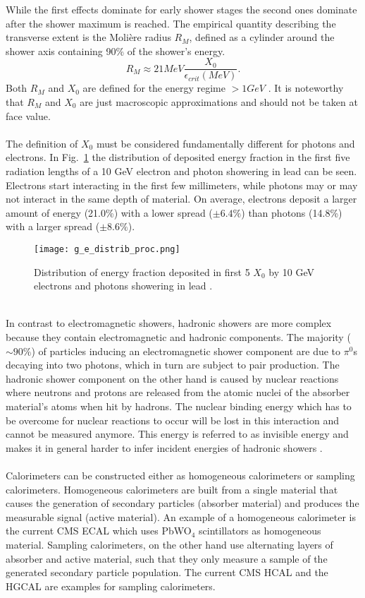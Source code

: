 \documentclass[../../main.tex]{subfiles}
\begin{document}
While the first effects dominate for early shower stages the second ones dominate after the shower maximum is reached. The empirical quantity describing the transverse extent is the Moli\`ere radius $R_M$, defined as a cylinder around the shower axis containing 90\% of the shower's energy.
\begin{equation}
	R_M \approx 21 MeV \frac{X_0}{\epsilon_{crit}(MeV)}.
\end{equation}
Both $R_M$ and $X_0$ are defined for the energy regime $>1GeV$ \cite{calo03}. It is noteworthy that $R_M$ and $X_0$ are just macroscopic approximations and should not be taken at face value.\\
\\
The definition of $X_0$ must be considered fundamentally different for photons and electrons. In Fig.~\ref{fig:g_e_dist} the distribution of deposited energy fraction in the first five radiation lengths of a 10 GeV electron and photon showering in lead can be seen. Electrons start interacting in the first few millimeters, while photons may or may not interact in the same depth of material. On average, electrons deposit a larger amount of energy (21.0\%) with a lower spread ($\pm6.4\%$) than photons (14.8\%) with a larger spread ($\pm 8.6\%$).
\begin{figure}[htp]
			\begin{center}
				\texttt{[image: g\_e\_distrib\_proc.png]}
				\caption{Distribution of energy fraction deposited in first 5 $X_0$ by 10 GeV electrons and photons showering in lead \cite{wigmans08}.}
				\label{fig:g_e_dist}
			\end{center}
\end{figure}
\\
In contrast to electromagnetic showers, hadronic showers are more complex because they contain electromagnetic and hadronic components. The majority ($\sim90\%$) of particles inducing an electromagnetic shower component are due to $\pi^0$s decaying into two photons, which in turn are subject to pair production. The hadronic shower component on the other hand is caused by nuclear reactions where neutrons and protons are released from the atomic nuclei of the absorber material's atoms when hit by hadrons. The nuclear binding energy which has to be overcome for nuclear reactions to occur will be lost in this interaction and cannot be measured anymore. This energy is referred to as invisible energy and makes it in general harder to infer incident energies of hadronic showers \cite{wigmans08}.\\
\\
Calorimeters can be constructed either as homogeneous calorimeters or sampling calorimeters. Homogeneous calorimeters are built from a single material that causes the generation of secondary particles (absorber material) and produces the measurable signal (active material). An example of a homogeneous calorimeter is the current CMS ECAL which uses PbWO$_4$ scintillators as homogeneous material. Sampling calorimeters, on the other hand use alternating layers of absorber and active material, such that they only measure a sample of the generated secondary particle population. The current CMS HCAL and the HGCAL are examples for sampling calorimeters.
\end{document}
